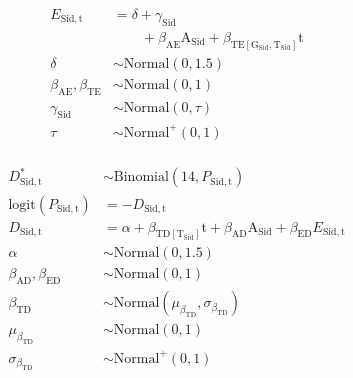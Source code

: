 \documentclass[12pt]{article}
\begin{document}
 

\newcommand{\midx}[2]{ \mathrm{#1},\mathrm{#2} }
\newcommand{\aidx}[3]{ \mathrm{#1},\mathrm{#2},\mathrm{#3} }
\newcommand{\vidx}[1]{ \mathrm{#1} }
\newcommand{\annot}[1]{ \begin{center} {\scriptsize #1 \phantom{XXXXX} } \end{center}}
\newcommand{\bb}[1]{ \beta_{\mathrm{#1}} }
\newcommand{\gm}[1]{ \gamma_{\mathrm{#1}} }


\begin{align*}
    E_{\midx{Sid}{t}}      & = \delta + \gamma_\vidx{Sid} \\
                           & \phantom{= \delta}~ + \bb{AE} \text{A}_\vidx{Sid} + \bb{TE [G_\vidx{Sid}, T_\vidx{Sid}]} \text{t}  \\
    \delta                 & \sim \text{Normal}(0, 1.5)    \\
    \bb{AE}, \bb{TE}       & \sim \text{Normal}(0, 1)      \\
    \gamma_\vidx{Sid}      & \sim \text{Normal}(0, \tau)   \\
    \tau                   & \sim \text{Normal}^{+}(0, 1)  \\
\end{align*}

\newpage


\begin{align*}
    D^{\ast}_{\midx{Sid}{t}}          & \sim \text{Binomial}( 14, P_{\midx{Sid}{t}} )  \\
    \text{logit}( P_{\midx{Sid}{t}} ) & = -D_{\midx{Sid}{t}} \\
    D_{\midx{Sid}{t}}                 & = \alpha + \bb{TD [T_{\vidx{Sid}}]} \text{t} + \bb{AD} \text{A}_{\vidx{Sid}} + \bb{ED} E_{\midx{Sid}{t}} \\
    \alpha                            & \sim \text{Normal}(0, 1.5) \\
    \bb{AD}, \bb{ED}                  & \sim \text{Normal}(0, 1)  \\
    \bb{TD}                           & \sim \text{Normal}(\mu_{\bb{TD}}, \sigma_{\bb{TD}}) \\
    \mu_{\bb{TD}}                     & \sim \text{Normal}(0, 1)      \\
    \sigma_{\bb{TD}}                  & \sim \text{Normal}^{+}(0, 1)  \\
\end{align*}
 
\end{document}
